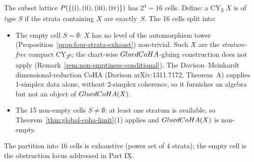 \begin{remark}
\label{rem:fifteen-cells}
The subset lattice $\mathcal{P}(\{(\text i), (\text{ii}),
(\text{iii}), (\text{iv})\})$ has $2^4 = 16$ cells. Define: a
CY\textsubscript{3} $X$ is of \emph{type $S$} if the strata
containing $X$ are exactly~$S$. The 16 cells split into:
\begin{itemize}
\item The empty cell $S = \emptyset$: $X$ has no level of the
  automorphism tower (Proposition~\ref{prop:four-strata-exhaust})
  non-trivial. Such $X$ are the \emph{stratum-free} compact
  CY\textsubscript{3}s; the chart-wise $\GlCoHA$-gluing
  construction does not apply
  (Remark~\ref{rem:non-emptiness-conditional}). The
  Davison--Meinhardt dimensional-reduction CoHA
  (Davison arXiv:1311.7172, Theorem~A) supplies 1-simplex data
  alone, without 2-simplex coherence, so it furnishes an algebra
  but not an object of $\GlCoHA(X)$.
\item The 15 non-empty cells $S \neq \emptyset$: at least one
  stratum is available, so Theorem~\ref{thm:global-coha-limit}(1)
  applies and $\GlCoHA(X)$ is non-empty.
\end{itemize}
The partition into 16 cells is exhaustive (power set of 4 strata);
the empty cell is the obstruction locus addressed in Part IX.
\end{remark}

